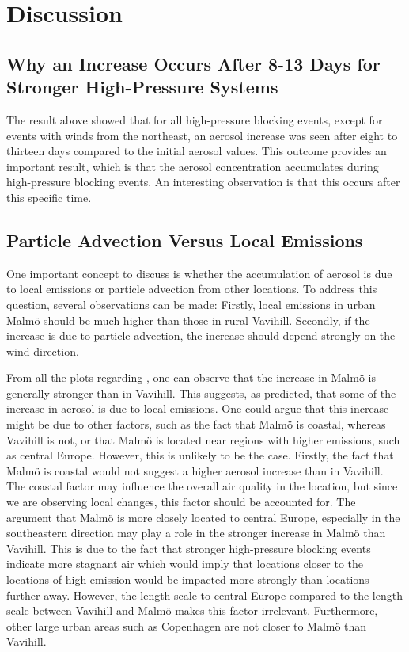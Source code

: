 \newpage
\section{Discussion}
\subsection{Why an Increase Occurs After 8-13 Days for Stronger High-Pressure Systems}
The result above showed that for all high-pressure blocking events, except for events with winds from the northeast, an aerosol increase was seen after eight to thirteen days compared to the initial aerosol values. This outcome provides an important result, which is that the aerosol concentration accumulates during high-pressure blocking events. An interesting observation is that this occurs after this specific time. 

\subsection{Particle Advection Versus Local Emissions}
One important concept to discuss is whether the accumulation of aerosol is due to local emissions or particle advection from other locations. To address this question, several observations can be made: Firstly, local emissions in urban Malmö should be much higher than those in rural Vavihill. Secondly, if the increase is due to particle advection, the increase should depend strongly on the wind direction. 

From all the plots regarding \PM, one can observe that the increase in Malmö is generally stronger than in Vavihill. This suggests, as predicted, that some of the increase in aerosol is due to local emissions. One could argue that this increase might be due to other factors, such as the fact that Malmö is coastal, whereas Vavihill is not, or that Malmö is located near regions with higher emissions, such as central Europe. However, this is unlikely to be the case. Firstly, the fact that Malmö is coastal would not suggest a higher aerosol increase than in Vavihill. The coastal factor may influence the overall air quality in the location, but since we are observing local changes, this factor should be accounted for. The argument that Malmö is more closely located to central Europe, especially in the southeastern direction may play a role in the stronger increase in Malmö than Vavihill. This is due to the fact that stronger high-pressure blocking events indicate more stagnant air which would imply that locations closer to the locations of high emission would be impacted more strongly than locations further away. However, the length scale to central Europe compared to the length scale between Vavihill and Malmö makes this factor irrelevant. Furthermore, other large urban areas such as Copenhagen are not closer to Malmö than Vavihill. 

